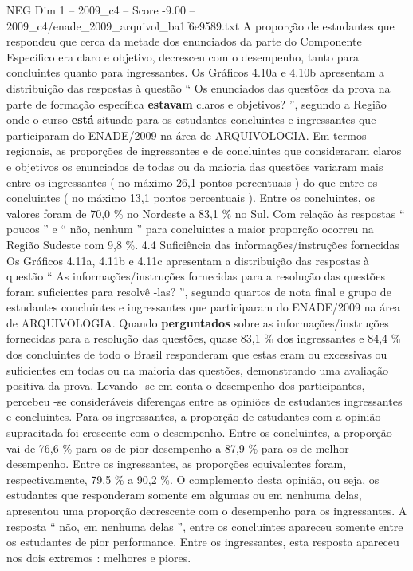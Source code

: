 \begin{textsample}{NEG Dim 1 – 2009\_c4 – Score -9.00 – 2009\_c4/enade\_2009\_arquivol\_ba1f6e9589.txt}
A proporção de estudantes que respondeu que cerca da metade dos enunciados da parte do Componente Específico era claro e objetivo, decresceu com o desempenho, tanto para concluintes quanto para ingressantes.
Os Gráficos 4.10a e 4.10b apresentam a distribuição das respostas à questão “ Os enunciados das questões da prova na parte de formação específica \textbf{estavam} claros e objetivos? ”, segundo a Região onde o curso \textbf{está} situado para os estudantes concluintes e ingressantes que participaram do ENADE/2009 na área de ARQUIVOLOGIA.
Em termos regionais, as proporções de ingressantes e de concluintes que consideraram claros e objetivos os enunciados de todas ou da maioria das questões variaram mais entre os ingressantes ( no máximo 26,1 pontos percentuais ) do que entre os concluintes ( no máximo 13,1 pontos percentuais ).
Entre os concluintes, os valores foram de 70,0 \% no Nordeste a 83,1 \% no Sul.
Com relação às respostas “ poucos ” e “ não, nenhum ” para concluintes a maior proporção ocorreu na Região Sudeste com 9,8 \%. 4.4 Suficiência das informações/instruções fornecidas Os Gráficos 4.11a, 4.11b e 4.11c apresentam a distribuição das respostas à questão “ As informações/instruções fornecidas para a resolução das questões foram suficientes para resolvê -las? ”, segundo quartos de nota final e grupo de estudantes concluintes e ingressantes que participaram do ENADE/2009 na área de ARQUIVOLOGIA.
Quando \textbf{perguntados} sobre as informações/instruções fornecidas para a resolução das questões, quase 83,1 \% dos ingressantes e 84,4 \% dos concluintes de todo o Brasil responderam que estas eram ou excessivas ou suficientes em todas ou na maioria das questões, demonstrando uma avaliação positiva da prova.
Levando -se em conta o desempenho dos participantes, percebeu -se consideráveis diferenças entre as opiniões de estudantes ingressantes e concluintes.
Para os ingressantes, a proporção de estudantes com a opinião supracitada foi crescente com o desempenho.
Entre os concluintes, a proporção vai de 76,6 \% para os de pior desempenho a 87,9 \% para os de melhor desempenho.
Entre os ingressantes, as proporções equivalentes foram, respectivamente, 79,5 \% a 90,2 \%.
O complemento desta opinião, ou seja, os estudantes que responderam somente em algumas ou em nenhuma delas, apresentou uma proporção decrescente com o desempenho para os ingressantes.
A resposta “ não, em nenhuma delas ”, entre os concluintes apareceu somente entre os estudantes de pior performance.
Entre os ingressantes, esta resposta apareceu nos dois extremos : melhores e piores.

\end{textsample}
